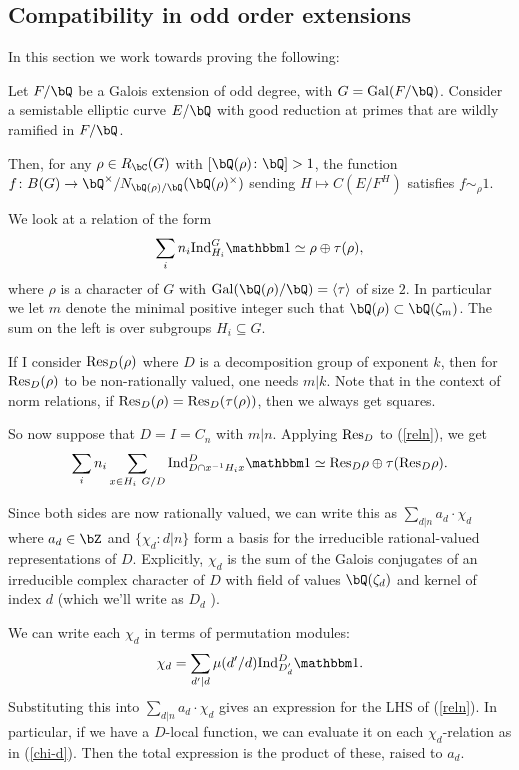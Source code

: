 \subsection{Compatibility in odd order extensions}

In this section we work towards proving the following:

\begin{thm}
    Let $F / \bQ$ be a Galois extension of odd degree, with $G = \Gal(F / \bQ)$. 
    Consider a semistable elliptic curve $E / \bQ$ with good reduction at primes that are wildly ramified in $F / \bQ$.
    
    Then, for any $\rho \in R_{\bC}(G)$ with $[\bQ(\rho)\colon \bQ] > 1$, the function $f \colon B(G) \to
    \bQ^{\times} / N_{\bQ(\rho) / \bQ}(\bQ(\rho)^{\times})$ sending $H \mapsto C(E / F^{H})$ satisfies $f \sim_{\rho} 1$.
\end{thm}

We look at a relation of the form
\begin{equation}\label{reln} 
    \sum_i n_i \Ind_{H_i}^G \trivial \simeq \rho \oplus \tau(\rho),
\end{equation}
where $\rho$ is a character of $G$ with $\Gal(\bQ(\rho) / \bQ) = \langle \tau \rangle $ of size $2$. In particular we let $m$ denote the minimal positive integer such that $\bQ(\rho) \subset \bQ(\zeta_m)$. The sum on the left is over subgroups $H_i \subseteq G$. 

If I consider $\mathrm{Res}_D(\rho)$ where $D$ is a decomposition group of exponent $k$, then for $\mathrm{Res}_D(\rho)$ to be non-rationally valued, one needs $m |k$. Note that in the context of norm relations, if $\mathrm{Res}_D(\rho) = \mathrm{Res}_D(\tau(\rho))$, then we always get squares.

So now suppose that $D = I = C_n$ with $m | n$. Applying $\mathrm{Res}_D$ to (\ref{reln}), we get
\begin{equation}\label{reln-resD}
\sum_i n_i \sum_{x \in H_i \ G / D} \Ind_{D \cap x^{-1}H_i x}^D \trivial \simeq \Res_D \rho \oplus \tau(\Res_D \rho).
\end{equation}

Since both sides are now rationally valued, we can write this as $\sum_{d |n} a_d \cdot \chi_d$ where $a_d \in \bZ$ and $\{ \chi_d \colon d|n \}$ form a basis for the irreducible rational-valued representations of $D$. Explicitly, $\chi_d$ is the sum of the Galois conjugates of an irreducible complex character of $D$ with field of values $\bQ(\zeta_d)$ and kernel of index $d$ (which we'll write as $D_d$ ).

We can write each $\chi_d$ in terms of permutation modules:
\begin{equation}\label{chi-d} \chi_d = \sum_{d' | d} \mu(d' / d)\Ind_{D_d'}^D \trivial .\end{equation}
Substituting this into  $\sum_{d |n} a_d \cdot \chi_d$ gives an expression for the LHS of (\ref{reln}).
In particular, if we have a $D$-local function, we can evaluate it on each $\chi_d$-relation as in (\ref{chi-d}). Then the total expression is the product of these, raised to $a_d$.
